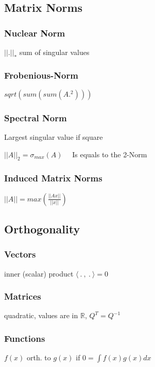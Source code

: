\documentclass[a4paper,11pt,twocolumn]{article}
\begin{document}
\subsection{Matrix Norms}

\subsubsection{Nuclear Norm}

$|| . ||_*$ sum of singular values

\subsubsection{Frobenious-Norm}
$sqrt(sum(sum(A.^2)))$

\subsubsection{Spectral Norm} 
Largest singular value if square 

$||A||_2 = \sigma_{max}(A)$ 
~~Is equals to the 2-Norm

\subsubsection{Induced Matrix Norms}
$ ||A|| = max \left( \frac{ ||Ax|| }{ ||x|| } \right)$

\subsection{Orthogonality}

\subsubsection{Vectors} 

inner (scalar) product $\langle ~.~,~.~ \rangle = 0$

\subsubsection{Matrices} 

quadratic, values are in $\mathbb{R}$, $Q^T = Q^{-1}$

\subsubsection{Functions}

$f(x)$ orth. to $g(x)$ if $0 = \int f(x) g(x) dx $
\end{document}
